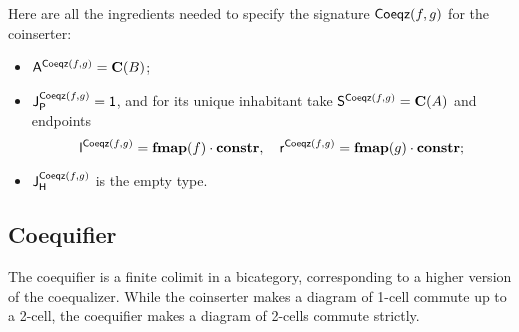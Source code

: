 Here are all the ingredients needed to specify the signature $\coequalizer f g$ for the coinserter:
\begin{itemize}
\item $\pointconstr[\coequalizer f g] = \constantP{B}$;
\item $\pathlabel[\coequalizer f g] = \unit$, and for its unique inhabitant take $\patharg[\coequalizer f g] = \constantP{A}$ and endpoints
  \[
  \pathleft[\coequalizer f g] = \comp{\fmap(f)}{\constr}, \quad
  \pathright[\coequalizer f g] = \comp{\fmap(g)}{\constr}; 
  \]
\item $\homotlabel[\coequalizer f g]$ is the empty type.
\end{itemize}




\subsection{Coequifier}
\label{sec:coequifier}

The coequifier is a finite colimit in a bicategory, corresponding to a
higher version of the coequalizer.
While the coinserter makes a diagram of 1-cell commute up to a 2-cell,
the coequifier makes a diagram of 2-cells commute strictly.

